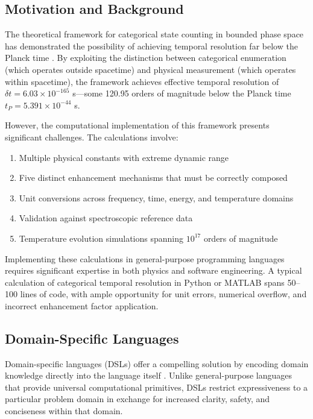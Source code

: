 \documentclass[twocolumn,10pt]{article}
\begin{document}
\subsection{Motivation and Background}

The theoretical framework for categorical state counting in bounded phase space has demonstrated the possibility of achieving temporal resolution far below the Planck time \cite{planck1899,wheeler1962}. By exploiting the distinction between categorical enumeration (which operates outside spacetime) and physical measurement (which operates within spacetime), the framework achieves effective temporal resolution of $\delta t = 6.03 \times 10^{-165}$ s---some 120.95 orders of magnitude below the Planck time $t_P = 5.391 \times 10^{-44}$ s.

However, the computational implementation of this framework presents significant challenges. The calculations involve:
\begin{enumerate}
    \item Multiple physical constants with extreme dynamic range
    \item Five distinct enhancement mechanisms that must be correctly composed
    \item Unit conversions across frequency, time, energy, and temperature domains
    \item Validation against spectroscopic reference data
    \item Temperature evolution simulations spanning $10^{17}$ orders of magnitude
\end{enumerate}

Implementing these calculations in general-purpose programming languages requires significant expertise in both physics and software engineering. A typical calculation of categorical temporal resolution in Python or MATLAB spans 50--100 lines of code, with ample opportunity for unit errors, numerical overflow, and incorrect enhancement factor application.

\subsection{Domain-Specific Languages}

Domain-specific languages (DSLs) offer a compelling solution by encoding domain knowledge directly into the language itself \cite{fowler2010dsl,mernik2005dsl}. Unlike general-purpose languages that provide universal computational primitives, DSLs restrict expressiveness to a particular problem domain in exchange for increased clarity, safety, and conciseness within that domain.
\end{document}
